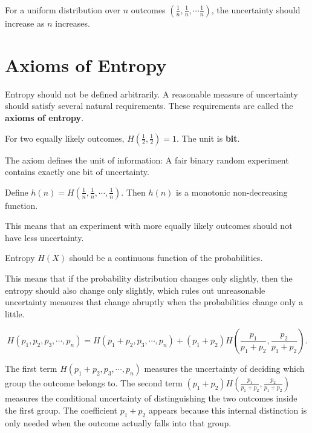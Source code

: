 \documentclass[11pt]{report}
\theoremstyle{lecturedefinition}
\theoremstyle{lectureremark}
\begin{document}
For a uniform distribution over $n$ outcomes $\left(\frac{1}{n},\frac{1}{n},\cdots\frac{1}{n}\right)$, the uncertainty should increase as $n$ increases.

\section{Axioms of Entropy}
Entropy should not be defined arbitrarily. A reasonable measure of uncertainty should satisfy several natural requirements. These requirements are called the \textbf{axioms of entropy}.

\begin{axiom}[Normalization]
For two equally likely outcomes, $H\left(\frac{1}{2},\frac{1}{2}\right)=1$. The unit is \textbf{bit}.
\end{axiom}

The axiom defines the unit of information: A fair binary random experiment contains exactly one bit of uncertainty.

\begin{axiom}[Monotonicity]
Define $h(n)=H\left(\frac{1}{n},\frac{1}{n},\cdots,\frac{1}{n}\right)$. Then $h(n)$ is a monotonic non-decreasing function.
\end{axiom}

This means that an experiment with more equally likely outcomes should not have less uncertainty.


\begin{axiom}[Continuity]
Entropy $H(X)$ should be a continuous function of the probabilities.
\end{axiom}
This means that if the probability distribution changes only slightly, then the entropy should also change only slightly, which rules out unreasonable uncertainty measures that change abruptly when the probabilities change only a little.


\begin{axiom}
\[
H\left(p_1, p_2, p_3,\cdots, p_n\right)=H\left(p_1+p_2,p_3,\cdots,p_n\right)+(p_1+p_2)H\left(\frac{p_1}{p_1+p_2},\frac{p_2}{p_1+p_2}\right).
\]

\end{axiom}
The first term $H\left(p_1+p_2,p_3,\cdots,p_n\right)$ measures the uncertainty of deciding which group the outcome belongs to. The second term $(p_1+p_2)H\left(\frac{p_1}{p_1+p_2},\frac{p_2}{p_1+p_2}\right)$ measures the conditional uncertainty of distinguishing the two outcomes inside the first group. The coefficient $p_1+p_2$ appears because this internal distinction is only needed when the outcome actually falls into that group.
\end{document}
